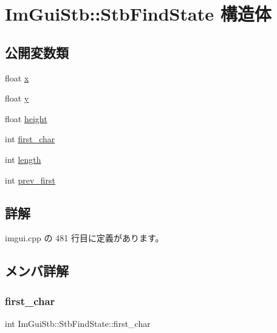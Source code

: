 \hypertarget{struct_im_gui_stb_1_1_stb_find_state}{}\section{Im\+Gui\+Stb\+:\+:Stb\+Find\+State 構造体}
\label{struct_im_gui_stb_1_1_stb_find_state}
\subsection*{公開変数類}
\begin{DoxyCompactItemize}
\item 
float \mbox{\hyperlink{struct_im_gui_stb_1_1_stb_find_state_a391de227ff11c00c2726988aed6fe5d6}{x}}
\item 
float \mbox{\hyperlink{struct_im_gui_stb_1_1_stb_find_state_a16d674ba203b37cecd265f02bc679449}{y}}
\item 
float \mbox{\hyperlink{struct_im_gui_stb_1_1_stb_find_state_a4bdad2788ba8c8785c8961e14e2529ac}{height}}
\item 
int \mbox{\hyperlink{struct_im_gui_stb_1_1_stb_find_state_a6ad39fc199ae5e89b565a6abf35fefd7}{first\+\_\+char}}
\item 
int \mbox{\hyperlink{struct_im_gui_stb_1_1_stb_find_state_a255b330cee989cac3fea58afd6f08c3d}{length}}
\item 
int \mbox{\hyperlink{struct_im_gui_stb_1_1_stb_find_state_ab0dbf2d67355b0454427a5c811c5174f}{prev\+\_\+first}}
\end{DoxyCompactItemize}


\subsection{詳解}


 imgui.\+cpp の 481 行目に定義があります。



\subsection{メンバ詳解}
\mbox{\label{struct_im_gui_stb_1_1_stb_find_state_a6ad39fc199ae5e89b565a6abf35fefd7}} 
\subsubsection{\texorpdfstring{first\+\_\+char}{first\_char}}
{\footnotesize\ttfamily int Im\+Gui\+Stb\+::\+Stb\+Find\+State\+::first\+\_\+char}



